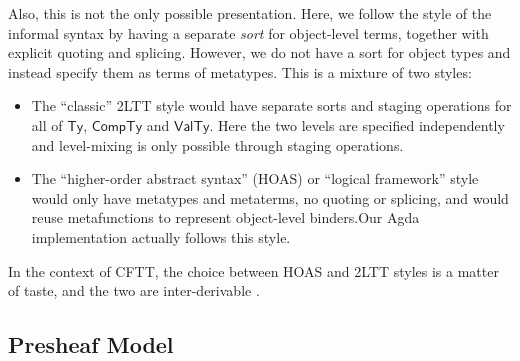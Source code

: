 \documentclass[acmsmall,screen,review,anonymous]{acmart}
\newcommand{\msf}[1]{{\mathsf{#1}}}
\newcommand{\VTy}{\msf{ValTy}}
\newcommand{\Ty}{\msf{Ty}}
\newcommand{\CTy}{\msf{CompTy}}
\theoremstyle{remark}
\begin{document}
Also, this is not the only possible presentation. Here, we follow the style of
the informal syntax by having a separate \emph{sort} for object-level terms,
together with explicit quoting and splicing. However, we do not have a sort for
object types and instead specify them as terms of metatypes. This is a mixture
of two styles:
\begin{itemize}
\item The ``classic'' 2LTT style would have separate sorts and staging
  operations for all of $\Ty$, $\CTy$ and $\VTy$. Here the two levels are
  specified independently and level-mixing is only possible through staging
  operations.
\item The ``higher-order abstract syntax'' (HOAS) or ``logical framework'' style
  would only have metatypes and metaterms, no quoting or splicing, and would
  reuse metafunctions to represent object-level binders.Our Agda implementation
  actually follows this style.
\end{itemize}
In the context of CFTT, the choice between HOAS and 2LTT styles is a matter of
taste, and the two are inter-derivable \cite{TODO}.

\subsection{Presheaf Model}
\end{document}
